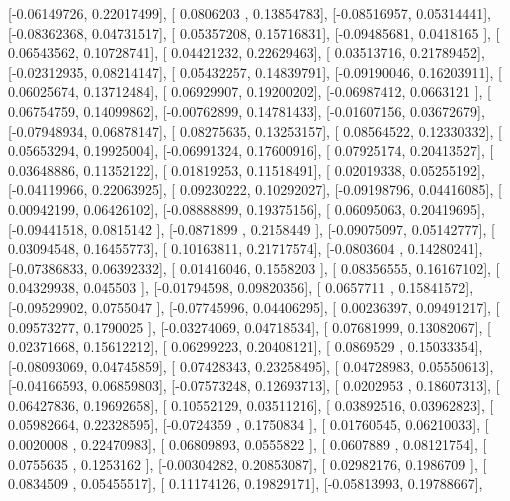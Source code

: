 \documentclass{article}
\begin{document}
       [-0.06149726,  0.22017499],
       [ 0.0806203 ,  0.13854783],
       [-0.08516957,  0.05314441],
       [-0.08362368,  0.04731517],
       [ 0.05357208,  0.15716831],
       [-0.09485681,  0.0418165 ],
       [ 0.06543562,  0.10728741],
       [ 0.04421232,  0.22629463],
       [ 0.03513716,  0.21789452],
       [-0.02312935,  0.08214147],
       [ 0.05432257,  0.14839791],
       [-0.09190046,  0.16203911],
       [ 0.06025674,  0.13712484],
       [ 0.06929907,  0.19200202],
       [-0.06987412,  0.0663121 ],
       [ 0.06754759,  0.14099862],
       [-0.00762899,  0.14781433],
       [-0.01607156,  0.03672679],
       [-0.07948934,  0.06878147],
       [ 0.08275635,  0.13253157],
       [ 0.08564522,  0.12330332],
       [ 0.05653294,  0.19925004],
       [-0.06991324,  0.17600916],
       [ 0.07925174,  0.20413527],
       [ 0.03648886,  0.11352122],
       [ 0.01819253,  0.11518491],
       [ 0.02019338,  0.05255192],
       [-0.04119966,  0.22063925],
       [ 0.09230222,  0.10292027],
       [-0.09198796,  0.04416085],
       [ 0.00942199,  0.06426102],
       [-0.08888899,  0.19375156],
       [ 0.06095063,  0.20419695],
       [-0.09441518,  0.0815142 ],
       [-0.0871899 ,  0.2158449 ],
       [-0.09075097,  0.05142777],
       [ 0.03094548,  0.16455773],
       [ 0.10163811,  0.21717574],
       [-0.0803604 ,  0.14280241],
       [-0.07386833,  0.06392332],
       [ 0.01416046,  0.1558203 ],
       [ 0.08356555,  0.16167102],
       [ 0.04329938,  0.045503  ],
       [-0.01794598,  0.09820356],
       [ 0.0657711 ,  0.15841572],
       [-0.09529902,  0.0755047 ],
       [-0.07745996,  0.04406295],
       [ 0.00236397,  0.09491217],
       [ 0.09573277,  0.1790025 ],
       [-0.03274069,  0.04718534],
       [ 0.07681999,  0.13082067],
       [ 0.02371668,  0.15612212],
       [ 0.06299223,  0.20408121],
       [ 0.0869529 ,  0.15033354],
       [-0.08093069,  0.04745859],
       [ 0.07428343,  0.23258495],
       [ 0.04728983,  0.05550613],
       [-0.04166593,  0.06859803],
       [-0.07573248,  0.12693713],
       [ 0.0202953 ,  0.18607313],
       [ 0.06427836,  0.19692658],
       [ 0.10552129,  0.03511216],
       [ 0.03892516,  0.03962823],
       [ 0.05982664,  0.22328595],
       [-0.0724359 ,  0.1750834 ],
       [ 0.01760545,  0.06210033],
       [ 0.0020008 ,  0.22470983],
       [ 0.06809893,  0.0555822 ],
       [ 0.0607889 ,  0.08121754],
       [ 0.0755635 ,  0.1253162 ],
       [-0.00304282,  0.20853087],
       [ 0.02982176,  0.1986709 ],
       [ 0.0834509 ,  0.05455517],
       [ 0.11174126,  0.19829171],
       [-0.05813993,  0.19788667],
\end{document}
